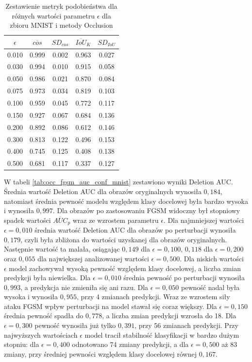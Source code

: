 \begin{table}[H] \centering \caption{Zestawienie metryk podobieństwa dla różnych wartości parametru \(\epsilon\) dla zbioru MNIST i metody Occlusion} \label{tab:occ_fgsm_cos_topk_mnist} \begin{tabular}{ccccc} \toprule $\epsilon$ & $\overline{cos}$ & $SD_{cos}$ & $\overline{IoU}_{K}$ & $SD_{IoU}$ \\ \midrule 0.010 & 0.999 & 0.002 & 0.963 & 0.027 \\ 0.030 & 0.994 & 0.010 & 0.915 & 0.058 \\ 0.050 & 0.986 & 0.021 & 0.870 & 0.084 \\ 0.075 & 0.973 & 0.034 & 0.819 & 0.103 \\ 0.100 & 0.959 & 0.045 & 0.772 & 0.117 \\ 0.150 & 0.927 & 0.067 & 0.684 & 0.136 \\ 0.200 & 0.892 & 0.086 & 0.612 & 0.146 \\ 0.300 & 0.813 & 0.122 & 0.496 & 0.153 \\ 0.400 & 0.745 & 0.125 & 0.408 & 0.138 \\ 0.500 & 0.681 & 0.117 & 0.337 & 0.127 \\ \bottomrule \end{tabular} \end{table}

W tabeli \ref{tab:occ_fgsm_auc_conf_mnist} zestawiono wyniki Deletion AUC. Średnia wartość Deletion AUC dla obrazów oryginalnych wynosiła $0{,}184$, natomiast średnia pewność modelu względem klasy docelowej była bardzo wysoka i wynosiła $0{,}997$.
Dla obrazów po zastosowaniu FGSM widoczny był stopniowy spadek wartości $\overline{AUC}_{p}$ wraz ze wzrostem parametru $\epsilon$. Dla najmniejszej wartości $\epsilon = 0{,}010$ średnia wartość Deletion AUC dla obrazów po perturbacji wynosiła $0{,}179$, czyli była zbliżona do wartości uzyskanej dla obrazów oryginalnych. Następnie wartość ta malała, osiągając $0{,}149$ dla $\epsilon = 0{,}100$, $0{,}118$ dla $\epsilon = 0{,}200$ oraz $0{,}055$ dla największej analizowanej wartości $\epsilon = 0{,}500$. Dla niskich wartości $\epsilon$ model zachowywał wysoką pewność względem klasy docelowej, a liczba zmian predykcji była niewielka. Dla $\epsilon = 0{,}010$ średnia pewność po perturbacji wynosiła $0{,}993$, a predykcja nie zmieniła się ani razu. Dla $\epsilon = 0{,}050$ pewność nadal była wysoka i wynosiła $0{,}955$, przy 4 zmianach predykcji.
Wraz ze wzrostem siły ataku FGSM wpływ perturbacji na model stawał się coraz większy. Dla $\epsilon = 0{,}150$ średnia pewność spadła do $0{,}778$, a liczba zmian predykcji wzrosła do 18. Dla $\epsilon = 0{,}300$ pewność wynosiła już tylko $0{,}391$, przy 56 zmianach predykcji. Przy najwyższych wartościach $\epsilon$ model tracił stabilność klasyfikacji w bardzo dużym stopniu: dla $\epsilon = 0{,}400$ odnotowano 74 zmiany predykcji, a dla $\epsilon = 0{,}500$ aż 83 zmiany, przy średniej pewności względem klasy docelowej równej $0{,}167$.

